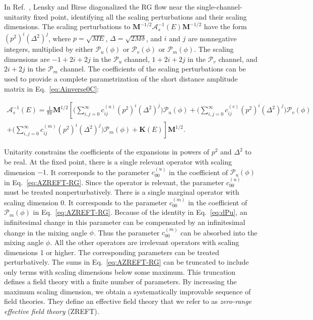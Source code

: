 \documentclass[%
 reprint,
 amsmath,amssymb,
 aps,
]{revtex4-1}
\begin{document}
In Ref.~\cite{Lensky:2011he}, Lensky and Birse diagonalized the RG flow near the single-channel-unitarity fixed point, identifying all the scaling perturbations and their scaling dimensions. 
The scaling perturbations to $\bm{M}^{-1/2} \bm{\mathcal{A}}_s^{-1}(E) \bm{M}^{-1/2}$ have the form $(p^2)^i (\Delta^2)^j$, where $p = \sqrt{ME}$,  $\Delta = \sqrt{2 M \delta}$, and $i$ and $j$ are nonnegative integers, multiplied by either $\bm{\mathcal{P}}_u(\phi)$ or $\bm{\mathcal{P}}_v(\phi)$ or $\bm{\mathcal{P}}_m(\phi)$. 
The scaling dimensions are $-1+2i+2j$ in the $\bm{\mathcal{P}}_u$ channel, $1+2i+2j$ in the $\bm{\mathcal{P}}_v$ channel, and $2i+2j$ in the $\bm{\mathcal{P}}_m$ channel. 
The coefficients of the scaling perturbations can be used to provide a complete parametrization of the short distance amplitude matrix in Eq.~\eqref{eq:Ainverse0C}:
\begin{widetext}
\begin{eqnarray}
\label{eq:AZREFT-RG}
\bm{\mathcal{A}}_s^{-1}(E) = \frac{1}{8\pi} \bm{M}^{1/2} 
\left[ \bigg( \sum_{i,j=0}^\infty c^{(u)}_{ij} (p^2)^i (\Delta^2)^j  \bigg) \bm{\mathcal{P}}_u(\phi)
 + \bigg( \sum_{i,j=0}^\infty c^{(v)}_{ij} (p^2)^i (\Delta^2)^j  \bigg) \bm{\mathcal{P}}_v(\phi) \right.
 \nonumber
 \\
\left.
 + \bigg( \sum_{i,j=0}^\infty c^{(m)}_{ij} (p^2)^i (\Delta^2)^j  \bigg) \bm{\mathcal{P}}_m(\phi) 
 + \bm{K}(E) \right]
\bm{M}^{1/2}.~~~
\end{eqnarray}
\end{widetext}
Unitarity constrains the coefficients of the expansions in powers of $p^2$ and $\Delta^2$ to be real. 
At the fixed point, there is a single relevant operator with scaling dimension $-1$. It corresponds to the  parameter $c^{(u)}_{00}$ in the coefficient of $\bm{\mathcal{P}}_u(\phi)$ in Eq.~\eqref{eq:AZREFT-RG}. 
Since the operator is relevant, the parameter $c^{(u)}_{00}$ must be treated nonperturbatively. 
There is a single marginal operator with scaling dimension 0. 
It corresponds to the  parameter $c^{(m)}_{00}$ in the coefficient of $\bm{\mathcal{P}}_m(\phi)$ in Eq.~\eqref{eq:AZREFT-RG}. 
Because of the identity in Eq.~\eqref{eq:dPu}, an infinitesimal change in this parameter can be compensated by an infinitesimal change in the mixing angle $\phi$.
Thus the parameter $c^{(m)}_{00}$ can be absorbed into the mixing angle $\phi$. 
All the other operators are irrelevant operators with scaling dimensions 1 or higher.  
The corresponding parameters can be treated perturbatively. 
The sums in Eq.~\eqref{eq:AZREFT-RG} can be truncated to include only terms with scaling dimensions below some maximum. 
This truncation defines a field theory with a finite number of parameters. 
By increasing the maximum scaling dimension, we obtain a systematically improvable sequence of field theories. 
They define an effective field theory that we refer to  as {\it zero-range effective field theory} (ZREFT).
\end{document}
